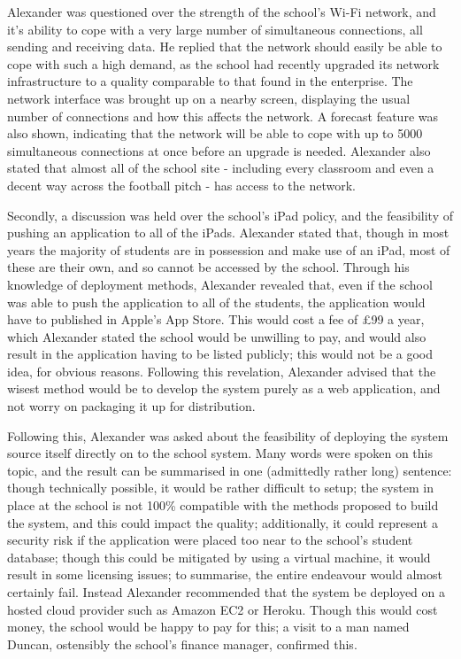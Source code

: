 Alexander was questioned over the strength of the school's Wi-Fi network, and it's ability to cope with a very large number of simultaneous connections, all sending and receiving data. He replied that the network should easily be able to cope with such a high demand, as the school had recently upgraded its network infrastructure to a quality comparable to that found in the enterprise. The network interface was brought up on a nearby screen, displaying the usual number of connections and how this affects the network. A forecast feature was also shown, indicating that the network will be able to cope with up to 5000 simultaneous connections at once before an upgrade is needed. Alexander also stated that almost all of the school site - including every classroom and even a decent way across the football pitch - has access to the network.

Secondly, a discussion was held over the school's iPad policy, and the feasibility of pushing an application to all of the iPads. Alexander stated that, though in most years the majority of students are in possession and make use of an iPad, most of these are their own, and so cannot be accessed by the school. Through his knowledge of deployment methods, Alexander revealed that, even if the school was able to push the application to all of the students, the application would have to published in Apple's App Store. This would cost a fee of \pounds99 a year, which Alexander stated the school would be unwilling to pay, and would also result in the application having to be listed publicly; this would not be a good idea, for obvious reasons. Following this revelation, Alexander advised that the wisest method would be to develop the system purely as a web application, and not worry on packaging it up for distribution.

Following this, Alexander was asked about the feasibility of deploying the system source itself directly on to the school system. Many words were spoken on this topic, and the result can be summarised in one (admittedly rather long) sentence: though technically possible, it would be rather difficult to setup; the system in place at the school is not 100\% compatible with the methods proposed to build the system, and this could impact the quality; additionally, it could represent a security risk if the application were placed too near to the school's student database; though this could be mitigated by using a virtual machine, it would result in some licensing issues; to summarise, the entire endeavour would almost certainly fail. Instead Alexander recommended that the system be deployed on a hosted cloud provider such as Amazon EC2 or Heroku. Though this would cost money, the school would be happy to pay for this; a visit to a man named Duncan, ostensibly the school's finance manager, confirmed this.